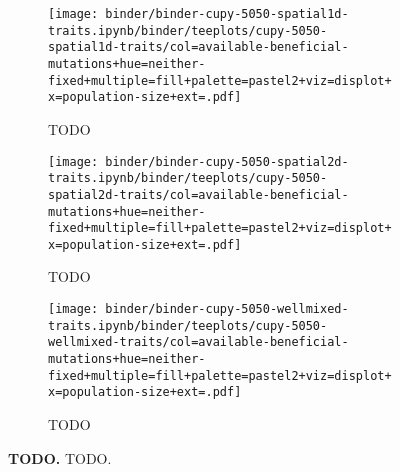 \begin{figure}[h]
    \begin{subfigure}[b]{\linewidth}
        \begin{minipage}{\textwidth}
          \texttt{[image: binder/binder-cupy-5050-spatial1d-traits.ipynb/binder/teeplots/cupy-5050-spatial1d-traits/col=available-beneficial-mutations+hue=neither-fixed+multiple=fill+palette=pastel2+viz=displot+x=population-size+ext=.pdf]}%
        \end{minipage}
        \begin{minipage}{\textwidth}
        \caption{TODO}
        \label{fig:neither-fixed-5050-cupy:spatial1d}
        \end{minipage}%
    \end{subfigure}

    \begin{subfigure}[b]{\linewidth}
        \begin{minipage}{\textwidth}
          \texttt{[image: binder/binder-cupy-5050-spatial2d-traits.ipynb/binder/teeplots/cupy-5050-spatial2d-traits/col=available-beneficial-mutations+hue=neither-fixed+multiple=fill+palette=pastel2+viz=displot+x=population-size+ext=.pdf]}%
        \end{minipage}
        \begin{minipage}{\textwidth}
        \caption{TODO}
        \label{fig:neither-fixed-5050-cupy:spatial2d}
        \end{minipage}%
    \end{subfigure}%

\begin{subfigure}[b]{\linewidth}
    \begin{minipage}{\textwidth}
      \texttt{[image: binder/binder-cupy-5050-wellmixed-traits.ipynb/binder/teeplots/cupy-5050-wellmixed-traits/col=available-beneficial-mutations+hue=neither-fixed+multiple=fill+palette=pastel2+viz=displot+x=population-size+ext=.pdf]}%
    \end{minipage}
    \begin{minipage}{\textwidth}
    \caption{TODO}
    \label{fig:neither-fixed-5050-cupy:wellmixed}
    \end{minipage}%
\end{subfigure}%


  \begin{minipage}{\textwidth}
    \caption{%
      \textbf{TODO.}
      \footnotesize
     TODO.
    }
    \label{fig:neither-fixed-5050-cupy}
  \end{minipage}
\end{figure}